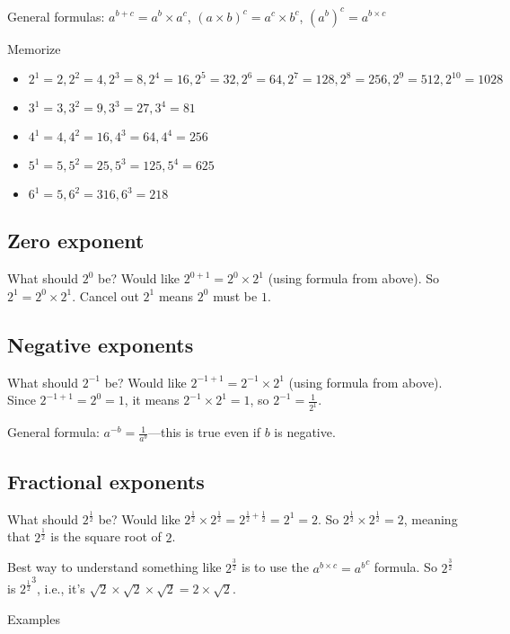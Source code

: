 \documentclass[fullpage,twocolumn]{article}
\begin{document}
General formulas: $a^{b + c} = a^b \times a^c$, $(a \times b)^c = a^c \times b^c$, $(a^b)^c = a^{b\times c}$

Memorize
\begin{itemize}
\item $2^1 = 2, 2^2 = 4, 2^3 = 8, 2^4 = 16, 2^5 = 32, 2^6 = 64, 2^7 = 128, 2^8 = 256, 2^9 = 512, 2^{10} = 1028$
\item $3^1 = 3, 3^2 = 9, 3^3 = 27, 3^4 = 81$
\item $4^1 = 4, 4^2 = 16, 4^3 = 64, 4^4 = 256$
\item $5^1 = 5, 5^2 = 25, 5^3 = 125, 5^4 = 625$
\item $6^1 = 5, 6^2 = 316, 6^3 = 218$
\end{itemize}

\subsection*{Zero exponent}

What should $2^0$ be? Would like $2^{0 + 1} = 2^0 \times 2^1$ (using formula from above). So $2^1 = 2^0 \times 2^1$.
Cancel out $2^1$ means $2^0$ must be $1$.

\subsection*{Negative exponents}

What should $2^{-1}$ be? Would like $2^{-1 + 1} = 2^{-1} \times 2^1$ (using formula from above). Since
$2^{-1 + 1} = 2^0 = 1$, it means $2^{-1} \times 2^1 = 1$, so $2^{-1} = \frac{1}{2^1}$.

General formula: $a^{-b} = \frac{1}{a^b}$---this is true even if $b$ is negative.

\subsection*{Fractional exponents}

What should $2^{\frac{1}{2}}$ be? Would like $2^\frac{1}{2} \times 2^\frac{1}{2} = 2^{\frac{1}{2} + \frac{1}{2}} = 2^1 = 2$.
So $2^\frac{1}{2} \times 2^\frac{1}{2} = 2$, meaning that $2^\frac{1}{2}$ is the square root of $2$.

Best way to understand something like $2^{\frac{3}{2}}$ is to use the $a^{b \times c} = {a^b}^c$ formula.
So $2^{\frac{3}{2}}$ is ${2^{\frac{1}{2}}}^3$, i.e., it's $\sqrt 2 \times \sqrt 2 \times \sqrt 2 = 2 \times \sqrt 2$.

Examples
\end{document}

